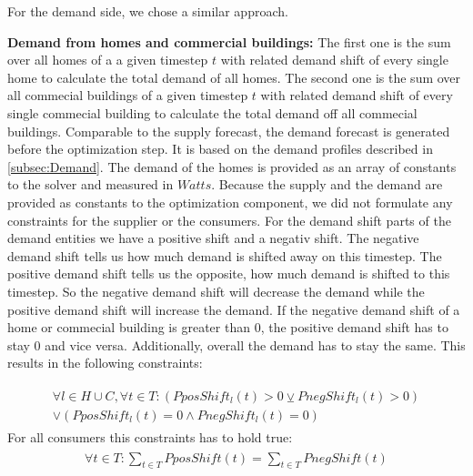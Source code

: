 For the demand side, we chose a similar approach.

\textbf{Demand from homes and commercial buildings:} The first one is the sum over all homes of a a given timestep $t$ with related demand shift of every single home to calculate the total demand of all homes.
The second one is the sum over all commecial buildings of a given timestep $t$ with related demand shift of every single commecial building to calculate the total demand off all commecial buildings.
Comparable to the supply forecast, the demand forecast is generated before the optimization step. 
It is based on the demand profiles described in \cref{subsec:Demand}. 
The demand of the homes is provided as an array of constants to the solver and measured in $Watts$. 
Because the supply and the demand are provided as constants to the optimization component, we did not formulate any constraints for the supplier or the consumers.
For the demand shift parts of the demand entities we have a positive shift and a negativ shift.
The negative demand shift tells us how much demand is shifted away on this timestep.
The positive demand shift tells us the opposite, how much demand is shifted to this timestep.
So the negative demand shift will decrease the demand while the positive demand shift will increase the demand.
If the negative demand shift of a home or commecial building is greater than 0, the positive demand shift has to stay 0 and vice versa. Additionally, overall the demand has to stay the same. 
This results in the following constraints:

\begin{align} \label{eq:shift}
\begin{split}
\forall l \in H\cup C, \forall t \in T: (PposShift_{l}(t) > 0 \veebar PnegShift_{l}(t) > 0)\\ \vee (PposShift_{l}(t) = 0 \wedge PnegShift_{l}(t) = 0)
\end{split}
\end{align}
For all consumers this constraints has to hold true:
\begin{align} \label{eq:shiftSum}
\begin{split}
\forall t \in T: \sum\limits_{t\in T} PposShift(t) = \sum\limits_{t\in T} PnegShift(t)\\
\end{split}
\end{align}

